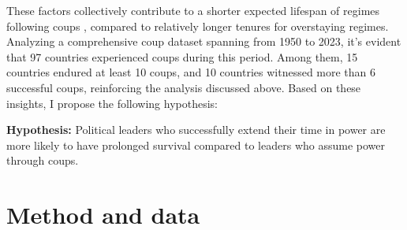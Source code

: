 \documentclass[
  12pt,
  a4paper,
  12pt]{article}
\begin{document}
These factors collectively contribute to a shorter expected lifespan of
regimes following coups \citep{dahl2023}, compared to relatively longer
tenures for overstaying regimes. Analyzing a comprehensive coup dataset
\citep{powell2011} spanning from 1950 to 2023, it's evident that 97
countries experienced coups during this period. Among them, 15 countries
endured at least 10 coups, and 10 countries witnessed more than 6
successful coups, reinforcing the analysis discussed above. Based on
these insights, I propose the following hypothesis:

\textbf{Hypothesis:} Political leaders who successfully extend their
time in power are more likely to have prolonged survival compared to
leaders who assume power through coups.

\hypertarget{method-and-data}{%
\section{Method and data}\label{method-and-data}}

\newpage


\renewcommand\refname{References}
  
\end{document}
